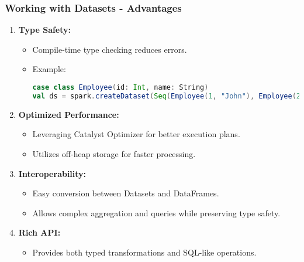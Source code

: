 \documentclass{beamer}
\begin{document}
\begin{frame}[fragile]
    \frametitle{Working with Datasets - Advantages}
    \begin{enumerate}
        \item \textbf{Type Safety:}
        \begin{itemize}
            \item Compile-time type checking reduces errors.
            \item Example:
            \begin{lstlisting}[language=Scala]
case class Employee(id: Int, name: String)
val ds = spark.createDataset(Seq(Employee(1, "John"), Employee(2, "Jane")))
            \end{lstlisting}
        \end{itemize}
        
        \item \textbf{Optimized Performance:}
            \begin{itemize}
                \item Leveraging Catalyst Optimizer for better execution plans.
                \item Utilizes off-heap storage for faster processing.
            \end{itemize}
            
        \item \textbf{Interoperability:}
            \begin{itemize}
                \item Easy conversion between Datasets and DataFrames.
                \item Allows complex aggregation and queries while preserving type safety.
            \end{itemize}

        \item \textbf{Rich API:}
            \begin{itemize}
                \item Provides both typed transformations and SQL-like operations.
            \end{itemize}
    \end{enumerate}
\end{frame}
\end{document}
